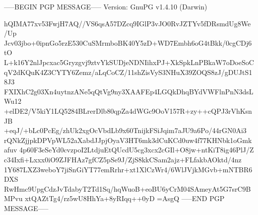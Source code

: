 -----BEGIN PGP MESSAGE-----
Version: GnuPG v1.4.10 (Darwin)

hQIMA77xv53FwjH7AQ//VS6qsA57DZcq9IGlP3vJO0RvJZTYv5fDRsmdUg8We/Up
Jcv03jbo+0ipnGo5rzE530CuSMrmboBK40Y5zD+WD7Embh6oG4tBkk/0cgCDj6tO
L+k16Y2nlJpcxac5Gryzgvj9ztvYkSUDjeNDNIihxPJ+XkSpkLnPBkaW7oDoeSoC
qV2dKQuK4Z3CYTY6Zemz/aLqCoCZ/11shZisVyS3NHuX39ZOQS8zJ/gDUJtS18J3
FXIXhC2g03Xn4uytnzANe5qQtVg9ny3XAAFEp4LGQkDhqBYdVWFlnPnN3dsLWu12
+elDE2/V5kiY1LQ5284BLrerDlb80qpZa4dWGc9OoV157R+zy++cQPJ3rVhKsnJB
+eqJ/+bLc0PcEg/zhUk2xgOcVbdLb9x60TnijkFSiJqim7aJU9a6Po/44rGN0Ai3
rQNkZjjpkDPVpWL52aXabdJJpjOyaV3HT6mk3dCuKCd0uw4f77KHNbk1oGmkafuv
4p60F3eSeYd0cvzpoI2LtdjuEtQUcdU5cg3xcx2cGIl+O8jw+ntKiT8ig46PlJ/Z
c34Ixfi+Lxxx0iO9ZJFHAz7gfCZ5pSe9J/ZjS8kkCSam2ajz+FLfakbAOktd/4nz
1Y687LXZ3weboY7jiSnGiYT77emRrhr+xt1XlCzWr4/6WlJVjkMGvb+mNTBR6DXS
RwHmc9UpgCdzJvTdabyT2Td1Sq/hqWuoB+eoBU6yCrM04SAmeyAt5G7srC9BMPvu
xtQAZtTg4/rz5wU8HhYa+8yRIqq++0yD
=AsgQ
-----END PGP MESSAGE-----
